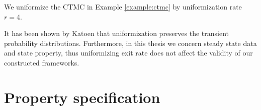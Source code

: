\begin{example}
      We uniformize the CTMC in Example \ref{example:ctmc} by uniformization rate $r=4$.
      \begin{figure}[H]
            \centering
            \label{fig:uniformized-ctmc}
      \end{figure}
\end{example}
It has been shown by Katoen \cite{katoen2013model} that uniformization preserves the transient
probability distributions. Furthermore, in this thesis we concern steady state data and state
property, thus uniformizing exit rate does not affect the validity of our constructed frameworks.

\section{Property specification}
